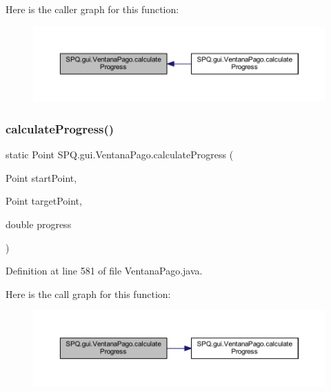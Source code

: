Here is the caller graph for this function\+:\nopagebreak
\begin{figure}[H]
\begin{center}
\leavevmode
\includegraphics[width=350pt]{class_s_p_q_1_1gui_1_1_ventana_pago_ab3583b9bfd461ce0bede2df8ea8c7bd1_icgraph}
\end{center}
\end{figure}
\mbox{\label{class_s_p_q_1_1gui_1_1_ventana_pago_aebf84331e3789dfd9444704d43ee3104}} 
\subsubsection{\texorpdfstring{calculate\+Progress()}{calculateProgress()}\hspace{0.1cm}{\footnotesize\ttfamily [2/4]}}
{\footnotesize\ttfamily static Point S\+P\+Q.\+gui.\+Ventana\+Pago.\+calculate\+Progress (\begin{DoxyParamCaption}\item[{Point}]{start\+Point,  }\item[{Point}]{target\+Point,  }\item[{double}]{progress }\end{DoxyParamCaption})\hspace{0.3cm}{\ttfamily [static]}}



Definition at line 581 of file Ventana\+Pago.\+java.

Here is the call graph for this function\+:\nopagebreak
\begin{figure}[H]
\begin{center}
\leavevmode
\includegraphics[width=350pt]{class_s_p_q_1_1gui_1_1_ventana_pago_aebf84331e3789dfd9444704d43ee3104_cgraph}
\end{center}
\end{figure}
\mbox{\label{class_s_p_q_1_1gui_1_1_ventana_pago_aa815284e8b31df848f8801518cf95c95}} 
